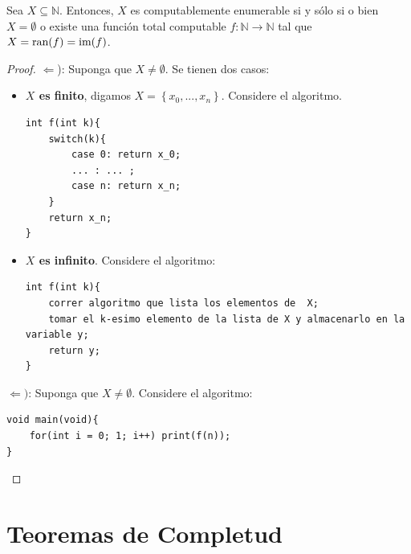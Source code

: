 \documentclass[12pt]{report}
\newcounter{it}
\theoremstyle{largebreak}
\newcommand\cf[3]{\ensuremath{#1:#2\rightarrow#3}}
\begin{document}
    \begin{theor}
        Sea $X\subseteq\mathbb{N}$. Entonces, $X$ es computablemente enumerable si y sólo si o bien $X=\emptyset$ o existe una función total computable $\cf{f}{\mathbb{N}}{\mathbb{N}}$ tal que $X=\textup{ran}(f)=\textup{im}(f)$.
    \end{theor}

    \begin{proof}
        $\Leftarrow$): Suponga que $X\neq\emptyset$. Se tienen dos casos:
        \begin{itemize}
            \item \textbf{$X$ es finito}, digamos $X=\left\{x_0,...,x_n \right\}$. Considere el algoritmo.
            \begin{lstlisting}
int f(int k){
    switch(k){
        case 0: return x_0;
        ... : ... ;
        case n: return x_n;
    }
    return x_n;
}
            \end{lstlisting}
            \item \textbf{$X$ es infinito}. Considere el algoritmo:
            \begin{lstlisting}
int f(int k){
    correr algoritmo que lista los elementos de  X;
    tomar el k-esimo elemento de la lista de X y almacenarlo en la variable y;
    return y;
}
            \end{lstlisting}
        \end{itemize}

        $\Leftarrow)$: Suponga que $X\neq\emptyset$. Considere el algoritmo:
        \begin{lstlisting}
void main(void){
    for(int i = 0; 1; i++) print(f(n));
}
        \end{lstlisting}
    \end{proof}

    \chapter{Teoremas de Completud}
\end{document}
